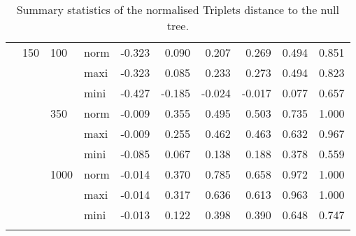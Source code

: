 \begin{longtable}{llllrrrrrr}
   & 150 & 100 & norm & -0.323 & 0.090 & 0.207 & 0.269 & 0.494 & 0.851 \\ 
   &  &  & maxi & -0.323 & 0.085 & 0.233 & 0.273 & 0.494 & 0.823 \\ 
   &  &  & mini & -0.427 & -0.185 & -0.024 & -0.017 & 0.077 & 0.657 \\ 
   &  & 350 & norm & -0.009 & 0.355 & 0.495 & 0.503 & 0.735 & 1.000 \\ 
   &  &  & maxi & -0.009 & 0.255 & 0.462 & 0.463 & 0.632 & 0.967 \\ 
   &  &  & mini & -0.085 & 0.067 & 0.138 & 0.188 & 0.378 & 0.559 \\ 
   &  & 1000 & norm & -0.014 & 0.370 & 0.785 & 0.658 & 0.972 & 1.000 \\ 
   &  &  & maxi & -0.014 & 0.317 & 0.636 & 0.613 & 0.963 & 1.000 \\ 
   &  &  & mini & -0.013 & 0.122 & 0.398 & 0.390 & 0.648 & 0.747 \\ 
   \hline
\hline
\caption{Summary statistics of the normalised Triplets distance to the null tree.} 
\label{Full_Tab_SummaryTrnull}
\end{longtable}
